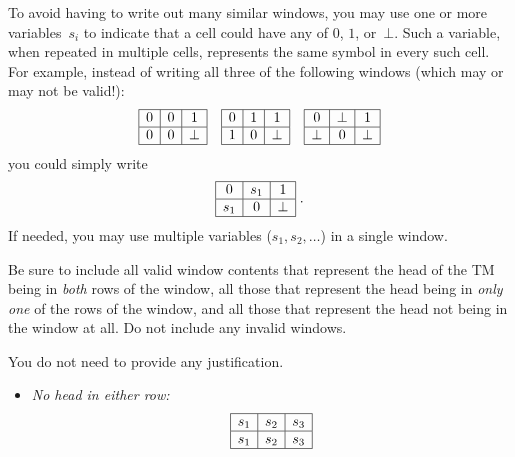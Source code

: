 \documentclass[11pt,addpoints, answers]{exam}
\begin{document}
\begin{questions}
\begin{parts}
  To avoid having to write out many similar windows, you may use one or more variables~$s_i$ to indicate that a cell could have any of $0$, $1$, or~$\bot$.
  Such a variable, when repeated in multiple cells, represents the same symbol in every such cell.
  For example, instead of writing all three of the following windows (which may or may not be valid!):
  \[
    \begin{array}{|c|c|c|}
      \hline
      0 & 0 & 1 \\
      \hline
      0 & 0 & \bot \\
      \hline
    \end{array}
    \quad
    \begin{array}{|c|c|c|}
      \hline
      0 & 1 & 1 \\
      \hline
      1 & 0 & \bot \\
      \hline
    \end{array}
    \quad
    \begin{array}{|c|c|c|}
      \hline
      0 & \bot & 1 \\
      \hline
      \bot & 0 & \bot \\
      \hline
    \end{array}
  \]
  you could simply write
  \[\begin{array}{|c|c|c|}
      \hline
      0 & s_1 & 1 \\
      \hline
      s_1 & 0 & \bot \\
      \hline
    \end{array} \; .
  \]
  If needed, you may use multiple variables ($s_1, s_2, \ldots$) in a single window.

  Be sure to include all valid window contents that represent the head of the TM being in \emph{both} rows of the window, all those that represent the head being in \emph{only one} of the rows of the window, and all those that represent the head not being in the window at all.
  Do not include any invalid windows.

  You do not need to provide any justification. 

  \pagebreak
  \begin{solution}
  \begin{itemize}
  \item \textit{No head in either row:}
  \[
  \begin{array}{|c|c|c|}
  \hline
  s_1 & s_2 & s_3\\
  \hline
  s_1 & s_2 & s_3\\
  \hline
  \end{array}
  \]
  

\end{itemize}
\end{solution}
\end{parts}
\end{questions}
\end{document}
